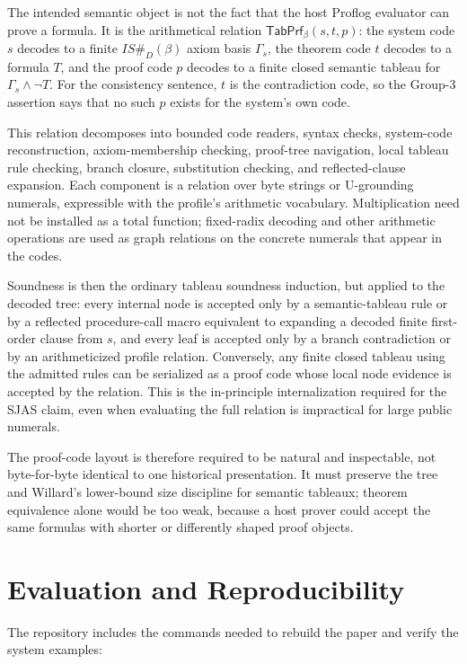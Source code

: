 \documentclass[runningheads]{llncs}
\begin{document}
The intended semantic object is not the fact that the host Proflog evaluator can
prove a formula.  It is the arithmetical relation
\(\mathsf{TabPrf}_\beta(s,t,p)\): the system code \(s\) decodes to a finite
\(IS\#_D(\beta)\) axiom basis \(\Gamma_s\), the theorem code \(t\) decodes to a
formula \(T\), and the proof code \(p\) decodes to a finite closed semantic
tableau for \(\Gamma_s \wedge \neg T\).  For the consistency sentence, \(t\)
is the contradiction code, so the Group-3 assertion says that no such \(p\)
exists for the system's own code.

This relation decomposes into bounded code readers, syntax checks, system-code
reconstruction, axiom-membership checking, proof-tree navigation, local tableau
rule checking, branch closure, substitution checking, and reflected-clause
expansion.  Each component is a relation over byte strings or U-grounding
numerals, expressible with the profile's arithmetic vocabulary.  Multiplication
need not be installed as a total function; fixed-radix decoding and other
arithmetic operations are used as graph relations on the concrete numerals that
appear in the codes.

Soundness is then the ordinary tableau soundness induction, but applied to the
decoded tree: every internal node is accepted only by a semantic-tableau rule
or by a reflected procedure-call macro equivalent to expanding a decoded finite
first-order clause from \(s\), and every leaf is accepted only by a branch
contradiction or by an arithmeticized profile relation.  Conversely, any finite
closed tableau using the admitted rules can be serialized as a proof code whose
local node evidence is accepted by the relation.  This is the in-principle
internalization required for the SJAS claim, even when evaluating the full
relation is impractical for large public numerals.

The proof-code layout is therefore required to be natural and inspectable, not
byte-for-byte identical to one historical presentation.  It must preserve the
tree and Willard's lower-bound size discipline for semantic tableaux; theorem
equivalence alone would be too weak, because a host prover could accept the
same formulas with shorter or differently shaped proof objects.

\section{Evaluation and Reproducibility}

The repository includes the commands needed to rebuild the paper and verify
the system examples:
\end{document}
